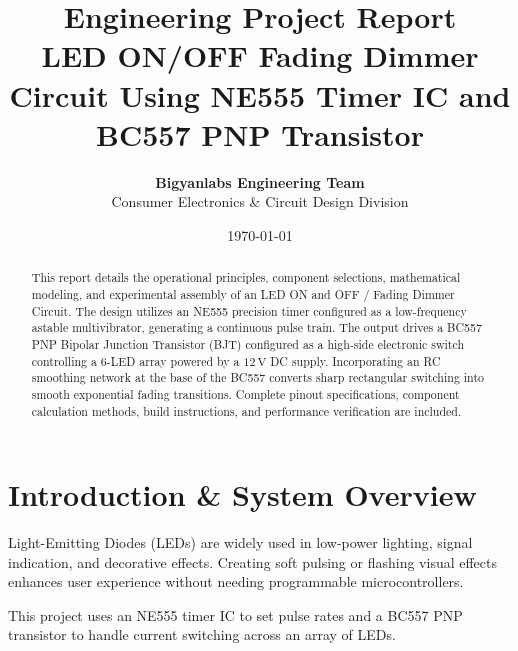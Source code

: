 \documentclass[11pt,a4paper]{article}
\title{\textbf{\Huge Engineering Project Report}\\[0.5em] \Large LED ON/OFF Fading Dimmer Circuit Using NE555 Timer IC and BC557 PNP Transistor}
\author{\textbf{Bigyanlabs Engineering Team}\\ Consumer Electronics \& Circuit Design Division}
\date{\today}
\begin{document}
\maketitle
\thispagestyle{empty}

\begin{abstract}
This report details the operational principles, component selections, mathematical modeling, and experimental assembly of an LED ON and OFF / Fading Dimmer Circuit. The design utilizes an NE555 precision timer configured as a low-frequency astable multivibrator, generating a continuous pulse train. The output drives a BC557 PNP Bipolar Junction Transistor (BJT) configured as a high-side electronic switch controlling a 6-LED array powered by a $12\,\text{V}$ DC supply. Incorporating an RC smoothing network at the base of the BC557 converts sharp rectangular switching into smooth exponential fading transitions. Complete pinout specifications, component calculation methods, build instructions, and performance verification are included.
\end{abstract}

\newpage
\tableofcontents
\newpage

\section{Introduction \& System Overview}
Light-Emitting Diodes (LEDs) are widely used in low-power lighting, signal indication, and decorative effects. Creating soft pulsing or flashing visual effects enhances user experience without needing programmable microcontrollers.

This project uses an NE555 timer IC to set pulse rates and a BC557 PNP transistor to handle current switching across an array of LEDs.
\end{document}
